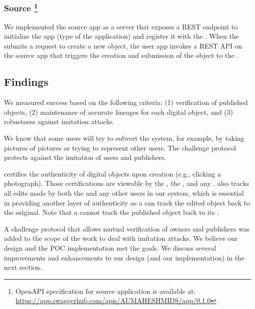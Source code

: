 \subsubsection{Source \App\footnote{OpenAPI specification for source \app application is available at: \url{https://app.swaggerhub.com/apis/AUMAHESHMIDS/app/0.1.0}}}
We implemented the source app as a server that exposes a REST endpoint to initialize the app (type of the application) and register it with the \ta. When the \owner submits a request to create a new object, the user app invokes a REST API on the source app that triggers the creation and submission of the object to the \ta. 

\subsection{Findings}
\label{sec:findings}

We measured success based on the following criteria: (1) verification of published objects, (2) maintenance of accurate lineages for each digital object, and (3) robustness against imitation attacks.

We know that some users will try to subvert the system, for example, by taking pictures of pictures or trying to represent other users. The challenge protocol protects against the imitation of users and publishers. 

\name certifies the authenticity of digital objects upon creation (e.g., clicking a photograph). Those certifications are viewable by the \publisher, the \owner, and any \reader. \name also tracks all edits made by both the \owner and any other users in our system, which is essential in providing another layer of authenticity as a \reader can track the edited object back to the original. Note that a \reader cannot track the published object back to its \owner. 

A challenge protocol that allows mutual verification of owners and publishers was added to the scope of the work to deal with imitation attacks. We believe our design and the POC implementation met the goals. We discuss several improvements and enhancements to our design (and our implementation) in the next section.